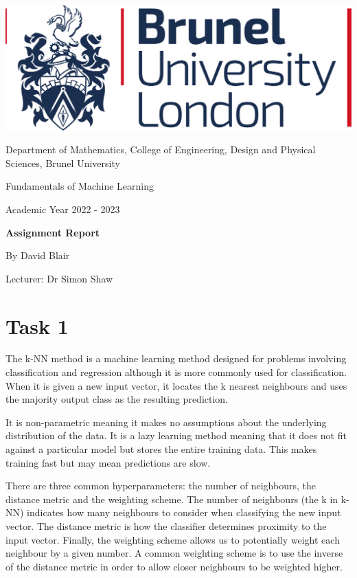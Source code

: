 \documentclass{article}
\begin{document}
	
	\vspace*{\fill}
	\begin{center}
		\includegraphics[scale = 0.15]{brunel logo.png}
		
		\vspace{1cm}
		\Large{Department of Mathematics, College of Engineering, Design and Physical Sciences, Brunel University}
		
		\vspace{1cm}
		\Large{Fundamentals of Machine Learning}
		
		\vspace{1cm}
		\large{Academic Year 2022 - 2023}
		
		\vspace{1.5cm}
		\LARGE{\bf Assignment Report}
		
		\vspace{1cm}
		\large{By David Blair}
		
		\vspace{0.1cm}
		\large{Lecturer: Dr Simon Shaw}
	\end{center}
	\vspace*{\fill}
	\newpage
	
	\section{Task 1}
	The k-NN method is a machine learning method designed for problems involving classification and regression although it is more commonly used for classification. When it is given a new input vector, it locates the k nearest neighbours and uses the majority output class as the resulting prediction. 
	
	It is non-parametric meaning it makes no assumptions about the underlying distribution of the data. It is a lazy learning method meaning that it does not fit against a particular model but stores the entire training data. This makes training fast but may mean predictions are slow. 
	
	There are three common hyperparameters: the number of neighbours, the distance metric and the weighting scheme. The number of neighbours (the k in k-NN) indicates how many neighbours to consider when classifying the new input vector. The distance metric is how the classifier determines proximity to the input vector. Finally, the weighting scheme allows us to potentially weight each neighbour by a given number. A common weighting scheme is to use the inverse of the distance metric in order to allow closer neighbours to be weighted higher. 
	
\end{document}

